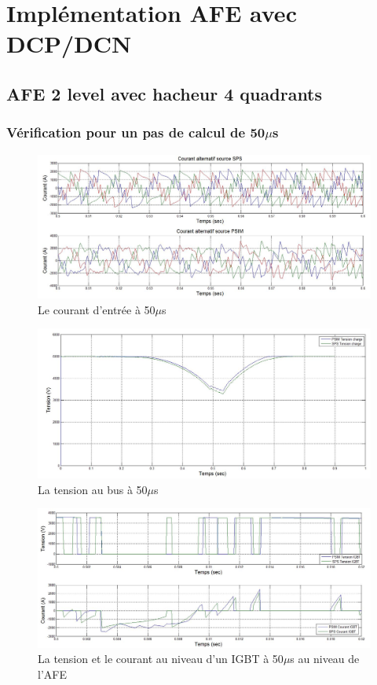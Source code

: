 \documentclass[11pt,letterpaper,final]{report}
\begin{document}
\clearpage
\section{Implémentation AFE avec DCP/DCN}
\subsection{AFE 2 level avec hacheur 4 quadrants}
\subsubsection{Vérification pour un pas de calcul de 50$\mu$s}

\begin{figure}[htb]
\centering
\includegraphics[scale=0.5]{Fig/Hach_AFE/50u/cour_al.jpg}
\caption{Le courant d'entrée à 50$\mu$s}
\label{AF_HA_cou50}
\end{figure}

\begin{figure}[htb]
\centering
\includegraphics[scale=0.5]{Fig/Hach_AFE/50u/ten_bus.jpg}
\caption{La tension au bus à 50$\mu$s}
\label{AF_HA_vch50}
\end{figure}


\begin{figure}[htb]
\centering
\includegraphics[scale=0.5]{Fig/Hach_AFE/50u/IGBT_AFE.jpg}
\caption{La tension et le courant au niveau d'un IGBT à 50$\mu$s au niveau de l'AFE}
\label{AF_HA_IGBT50}
\end{figure}
\end{document}
